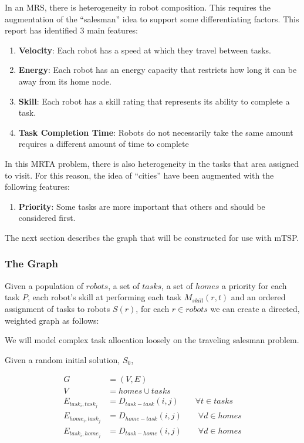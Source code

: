 \documentclass[a4paper]{article}
\begin{document}
In an MRS, there is heterogeneity in robot composition. This requires the augmentation of the ``salesman'' idea to support some differentiating factors. This report has identified 3 main features:

\begin{enumerate}
\item \textbf{Velocity}: Each robot has a speed at which they travel between tasks.
\item \textbf{Energy}: Each robot has an energy capacity that restricts how long it can be away from its home node.
\item \textbf{Skill}: Each robot has a skill rating that represents its ability to complete a task.
\item \textbf{Task Completion Time}: Robots do not necessarily take the same amount requires a different amount of time to complete

\end{enumerate}

In this MRTA problem, there is also heterogeneity in the tasks that area assigned to visit. For this reason, the idea of ``cities'' have been augmented with the following features:

\begin{enumerate}
\item \textbf{Priority}: Some tasks are more important that others and should be considered first.
\end{enumerate}

The next section describes the graph that will be constructed for use with mTSP.

\subsubsection{The Graph}
Given a population of $\mathit{robots}$, a set of $\mathit{tasks}$, a set of $\mathit{homes}$ a priority for each task $P$, each robot's skill at performing each task $M_{skill}(r,t)$ and an ordered assignment of tasks to robots $S(r)$, for each $r \in \mathit{robots}$
we can create a directed, weighted graph as follows:

We will model complex task allocation loosely on the traveling salesman problem.

Given a random initial solution, $S_0$,

\begin{align*}
	G &= (V, E) \\
	V &= \mathit{homes} \cup \mathit{tasks} \\
	E_{task_i, task_j} &= D_\mathit{task-task}(i,j) \qquad \forall t \in \mathit{tasks} \\
  E_{home_i, task_j} &= D_\mathit{home-task}(i,j) \qquad \forall d \in \mathit{homes}\\
	E_{task_i, home_j} &= D_\mathit{task-home}(i,j) \qquad \forall d \in \mathit{homes}\\
\end{align*}
%
\end{document}

